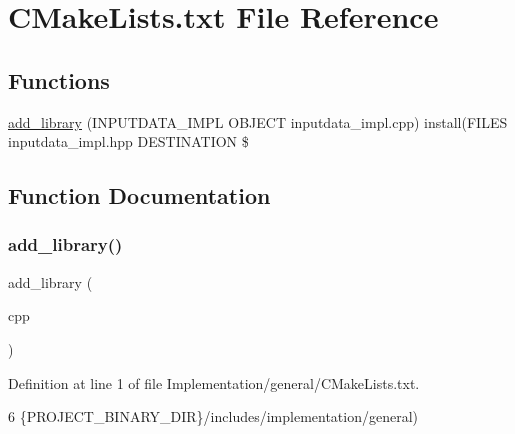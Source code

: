 \hypertarget{Implementation_2general_2CMakeLists_8txt}{}\section{C\+Make\+Lists.\+txt File Reference}
\label{Implementation_2general_2CMakeLists_8txt}
\subsection*{Functions}
\begin{DoxyCompactItemize}
\item 
\hyperlink{Implementation_2general_2CMakeLists_8txt_ae19564597d7d3366572af7c5ef28c7dd}{add\+\_\+library} (I\+N\+P\+U\+T\+D\+A\+T\+A\+\_\+\+I\+M\+PL O\+B\+J\+E\+CT inputdata\+\_\+impl.\+cpp) install(F\+I\+L\+ES inputdata\+\_\+impl.\+hpp D\+E\+S\+T\+I\+N\+A\+T\+I\+ON \$
\end{DoxyCompactItemize}


\subsection{Function Documentation}
\mbox{\label{Implementation_2general_2CMakeLists_8txt_ae19564597d7d3366572af7c5ef28c7dd}} 
\subsubsection{\texorpdfstring{add\+\_\+library()}{add\_library()}}
{\footnotesize\ttfamily add\+\_\+library (\begin{DoxyParamCaption}\item[{I\+N\+P\+U\+T\+D\+A\+T\+A\+\_\+\+I\+M\+PL O\+B\+J\+E\+CT inputdata\+\_\+impl.}]{cpp }\end{DoxyParamCaption})}



Definition at line 1 of file Implementation/general/\+C\+Make\+Lists.\+txt.


\begin{DoxyCode}
6                \{PROJECT\_BINARY\_DIR\}/includes/implementation/general)
\end{DoxyCode}
